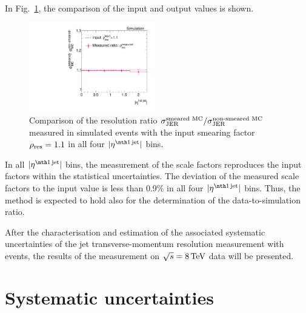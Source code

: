 In Fig.~\ref{res:fig:MCClosureRatio}, the comparison of the input and output values is shown. 
\begin{figure}[b]
  \centering
    \includegraphics[width=0.49\textwidth]{figures/resolution/methodology/MCClosureRatio.pdf}
     \caption{Comparison of the resolution ratio $\sigma_\mathrm{JER}^{\text{smeared MC}}/\sigma_\mathrm{JER}^{\text{non-smeared MC}}$ measured in simulated events with the input smearing factor $\rho_\mathrm{res}=1.1$ in all four $|\etafirstjet|$ bins.}
  \label{res:fig:MCClosureRatio}
\end{figure}
In all $|\etafirstjet|$ bins, the measurement of the scale factors reproduces the input factors within the statistical uncertainties.
The deviation of the measured scale factors to the input value is less than 0.9\% in all four $|\etafirstjet|$ bins.
Thus, the method is expected to hold also for the determination of the data-to-simulation ratio.

After the characterisation and estimation of the associated systematic uncertainties of the jet transverse-momentum resolution measurement with \GAMJET events, the results of the measurement on $\sqrt{s}=8\,\text{Te}\kern-0.06667em\text{V}$ data will be presented.



\FloatBarrier
\chapter{Systematic uncertainties}

